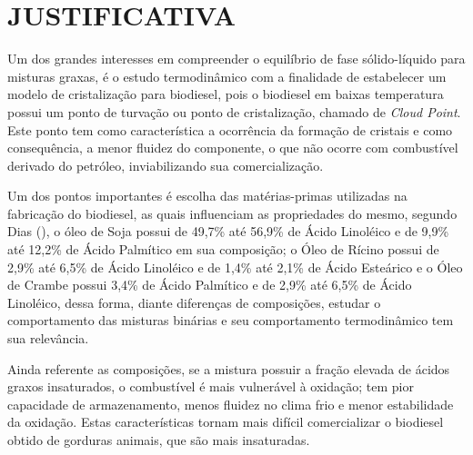 
\chapter{JUSTIFICATIVA}
\label{chap:justifiativa}

Um dos grandes interesses em compreender o equilíbrio de fase sólido-líquido para misturas graxas, é o estudo termodinâmico com a finalidade de estabelecer um modelo de cristalização para biodiesel, pois o biodiesel em baixas temperatura possui um ponto de turvação ou ponto de cristalização, chamado de \textit{Cloud Point}. Este ponto tem como característica a ocorrência da formação de cristais e como consequência, a menor fluidez do componente, o que não ocorre com combustível derivado do petróleo, inviabilizando sua comercialização.

Um dos pontos importantes é escolha das matérias-primas utilizadas na fabricação do biodiesel, as quais influenciam as propriedades do mesmo, segundo Dias (\citeyear{Angelica}), o óleo de Soja possui de 49,7\% até 56,9\% de Ácido Linoléico e de 9,9\% até 12,2\% de Ácido Palmítico em sua composição; o Óleo de Rícino possui de 2,9\% até 6,5\% de Ácido Linoléico e de 1,4\% até 2,1\% de Ácido Esteárico e o Óleo de Crambe possui 3,4\% de Ácido Palmítico e de 2,9\% até 6,5\% de Ácido Linoléico, dessa forma, diante diferenças de composições, estudar o comportamento das misturas binárias e seu comportamento termodinâmico tem sua relevância.

Ainda referente as composições, se a mistura possuir a fração elevada de  ácidos graxos insaturados, o combustível é mais vulnerável à oxidação;  tem pior capacidade de armazenamento,  menos fluidez no clima frio e menor estabilidade da oxidação. Estas características tornam mais difícil comercializar o biodiesel obtido de gorduras animais, que são mais insaturadas.  \cite{Leggieri2018a,Costa2012,Imahara2006}


